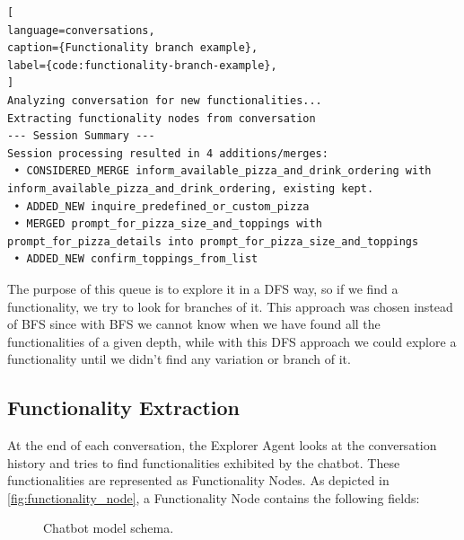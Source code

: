\begin{itemize}
\begin{lstlisting}[
language=conversations,
caption={Functionality branch example},
label={code:functionality-branch-example},
]
Analyzing conversation for new functionalities...
Extracting functionality nodes from conversation
--- Session Summary ---
Session processing resulted in 4 additions/merges:
 • CONSIDERED_MERGE inform_available_pizza_and_drink_ordering with inform_available_pizza_and_drink_ordering, existing kept.
 • ADDED_NEW inquire_predefined_or_custom_pizza
 • MERGED prompt_for_pizza_size_and_toppings with prompt_for_pizza_details into prompt_for_pizza_size_and_toppings
 • ADDED_NEW confirm_toppings_from_list
\end{lstlisting}

\end{itemize}


The purpose of this queue is to explore it in a \ac{DFS} way,
so if we find a functionality, we try to look for branches of it.
This approach was chosen instead of \ac{BFS}
since with \ac{BFS} we cannot know when we have found
all the functionalities of a given depth,
while with this \ac{DFS} approach we could explore a functionality
until we didn't find any variation or branch of it.

\subsection{Functionality Extraction}\label{subsec:functionality_extraction}

At the end of each conversation,
the Explorer Agent looks at the conversation history
and tries to find functionalities exhibited by the chatbot.
These functionalities are represented as Functionality Nodes.
As depicted in \autoref{fig:functionality_node},
a Functionality Node contains the following fields:

\begin{figure}[htpb]
  \centering
  \resizebox{0.9\textwidth}{!}{
    
  }
  \caption{Chatbot model schema.}
  \label{fig:functionality_node}
\end{figure}

